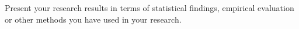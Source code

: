Present your research results in terms of statistical findings,
empirical evaluation or other methods you have used in your research.
